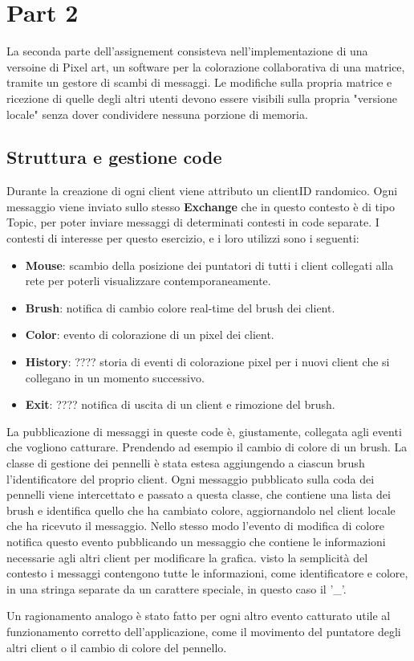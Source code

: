 \chapter{Part 2}
\label{ch:into} %

La seconda parte dell'assignement consisteva nell'implementazione di una versoine di Pixel art, un software per la colorazione 
collaborativa di una matrice, tramite un gestore di scambi di messaggi. Le modifiche sulla propria matrice e ricezione di quelle degli altri utenti 
devono essere visibili sulla propria "versione locale" senza dover condividere nessuna porzione di memoria.

\section{Struttura e gestione code}

Durante la creazione di ogni client viene attributo un clientID randomico. Ogni messaggio viene inviato sullo stesso \textbf{Exchange} che in questo contesto
è di tipo Topic, per poter inviare messaggi di determinati contesti in code separate. I contesti di interesse per questo esercizio, e i loro utilizzi sono i seguenti: 
\begin{itemize}
    \item \textbf{Mouse}: scambio della posizione dei puntatori di tutti i client collegati alla rete per poterli visualizzare contemporaneamente.
    \item \textbf{Brush}: notifica di cambio colore real-time del brush dei client.
    \item \textbf{Color}: evento di colorazione di un pixel dei client.
    \item \textbf{History}: ???? storia di eventi di colorazione pixel per i nuovi client che si collegano in un momento successivo. %
    \item \textbf{Exit}: ???? notifica di uscita di un client e rimozione del brush.%
\end{itemize}

La pubblicazione di messaggi in queste code è, giustamente, collegata agli eventi che vogliono catturare.
Prendendo ad esempio il cambio di colore di un brush. La classe di gestione dei pennelli è stata estesa aggiungendo a ciascun brush l'identificatore del proprio client.
Ogni messaggio pubblicato sulla coda dei pennelli viene intercettato e passato a questa classe, che contiene una lista dei brush e identifica quello che ha cambiato colore, aggiornandolo nel client locale che ha ricevuto il messaggio. 
Nello stesso modo l'evento di modifica di colore notifica questo evento pubblicando un messaggio che contiene le informazioni
necessarie agli altri client per modificare la grafica. visto la semplicità del contesto i messaggi contengono tutte le informazioni, come identificatore e colore, in una stringa 
separate da un carattere speciale, in questo caso il '\_'.

Un ragionamento analogo è stato fatto per ogni altro evento catturato utile al funzionamento corretto dell'applicazione, come il movimento del puntatore 
degli altri client o il cambio di colore del pennello.
